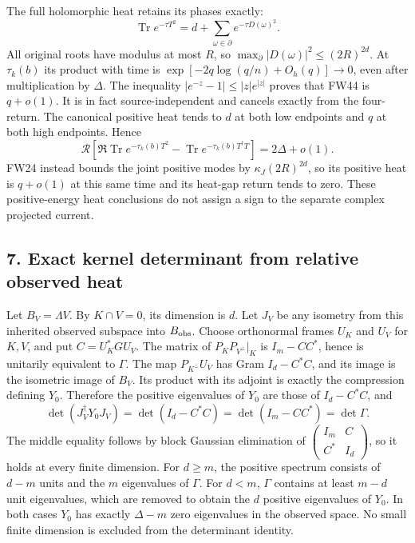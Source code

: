 \documentclass[11pt]{article}
\begin{document}
The full holomorphic heat retains its phases exactly: \[
\operatorname{Tr}e^{-\tau T^2}=d+\sum_{\omega\in\partial}e^{-\tau D(\omega)^2}.
\tag{FW44}
\] All original roots have modulus at most \(R\), so \(\max_\partial|D(\omega)|^2\le(2R)^{2d}\). At \(\tau_k(b)\) its product with time is \(\exp[-2q\log(q/n)+O_h(q)]\to0\), even after multiplication by \(\Delta\). The inequality \(|e^{-z}-1|\le|z|e^{|z|}\) proves that FW44 is \(q+o(1)\). It is in fact source-independent and cancels exactly from the four-return. The canonical positive heat tends to \(d\) at both low endpoints and \(q\) at both high endpoints. Hence \[
\mathcal R[\Re\operatorname{Tr}e^{-\tau_k(b)T^2}-\operatorname{Tr}e^{-\tau_k(b)T^{\dagger}T}]
=2\Delta+o(1).
\tag{FW45}
\] FW24 instead bounds the joint positive modes by \(\kappa_J(2R)^{2d}\), so its positive heat is \(q+o(1)\) at this same time and its heat-gap return tends to zero. These positive-energy heat conclusions do not assign a sign to the separate complex projected current.

\subsection{7. Exact kernel determinant from relative observed heat}\label{exact-kernel-determinant-from-relative-observed-heat}

Let \(B_V=\Lambda V\). By \(K\cap V=0\), its dimension is \(d\). Let \(J_V\) be any isometry from this inherited observed subspace into \(B_{\rm obs}\). Choose orthonormal frames \(U_K\) and \(U_V\) for \(K,V\), and put \(C=U_K^*GU_V\). The matrix of \(P_KP_{V^\perp}|_K\) is \(I_m-CC^*\), hence is unitarily equivalent to \(\Gamma\). The map \(P_{K^\perp}U_V\) has Gram \(I_d-C^*C\), and its image is the isometric image of \(B_V\). Its product with its adjoint is exactly the compression defining \(Y_0\). Therefore the positive eigenvalues of \(Y_0\) are those of \(I_d-C^*C\), and \[
\det(J_V^{\dagger}Y_0J_V)=\det(I_d-C^*C)=\det(I_m-CC^*)=\det\Gamma.
\tag{FW46}
\] The middle equality follows by block Gaussian elimination of \(\left(\begin{smallmatrix}I_m&C\\C^*&I_d\end{smallmatrix}\right)\), so it holds at every finite dimension. For \(d\ge m\), the positive spectrum consists of \(d-m\) units and the \(m\) eigenvalues of \(\Gamma\). For \(d<m\), \(\Gamma\) contains at least \(m-d\) unit eigenvalues, which are removed to obtain the \(d\) positive eigenvalues of \(Y_0\). In both cases \(Y_0\) has exactly \(\Delta-m\) zero eigenvalues in the observed space. No small finite dimension is excluded from the determinant identity.
\end{document}
